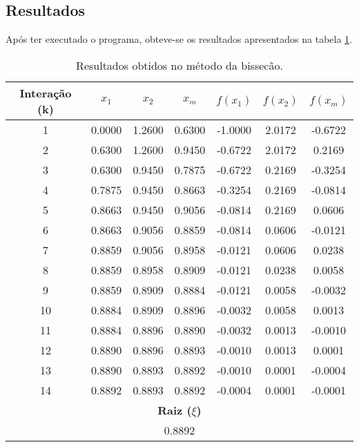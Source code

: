 \documentclass[a4paper,11pt, twoside]{article}
\newcommand{\n}[1]{\textbf{#1}}
\begin{document}
    \subsection*{Resultados}
    Após ter executado o programa, obteve-se os resultados apresentados na tabela \ref{bi}.
    	{\linespread{1}
	\begin{table}[!th]
		\begin{center}
		    \begin{tabular}{ c c c c c c c }
		        \toprule[0.11em]
		        \n{Interação (k)} & \n{$x_1$} & \n{$x_2$} & \n{$x_m$} & \n{$f(x_1)$} & \n{$f(x_2)$} & \n{$f(x_m)$}\\
		        \toprule[0.11em]
				1 & 0.0000 & 1.2600 & 0.6300 & -1.0000 & 2.0172 & -0.6722\\
				\midrule
				2 & 0.6300 & 1.2600 & 0.9450 & -0.6722 & 2.0172 & 0.2169\\
				\midrule
				3 & 0.6300 & 0.9450 & 0.7875 & -0.6722 & 0.2169 & -0.3254\\
				\midrule
				4 & 0.7875 & 0.9450 & 0.8663 & -0.3254 & 0.2169 & -0.0814\\
				\midrule
				5 & 0.8663 & 0.9450 & 0.9056 & -0.0814 & 0.2169 & 0.0606\\
				\midrule
				6 & 0.8663 & 0.9056 & 0.8859 & -0.0814 & 0.0606 & -0.0121\\
				\midrule
				7 & 0.8859 & 0.9056 & 0.8958 & -0.0121 & 0.0606 & 0.0238\\
				\midrule
				8 & 0.8859 & 0.8958 & 0.8909 & -0.0121 & 0.0238 & 0.0058\\
				\midrule
				9 & 0.8859 & 0.8909 & 0.8884 & -0.0121 & 0.0058 & -0.0032\\
				\midrule
				10 & 0.8884 & 0.8909 & 0.8896 & -0.0032 & 0.0058 & 0.0013\\
				\midrule
				11 & 0.8884 & 0.8896 & 0.8890 & -0.0032 & 0.0013 & -0.0010\\
				\midrule
				12 & 0.8890 & 0.8896 & 0.8893 & -0.0010 & 0.0013 & 0.0001\\
				\midrule
				13 & 0.8890 & 0.8893 & 0.8892 & -0.0010 & 0.0001 & -0.0004\\
				\midrule
				14 & 0.8892 & 0.8893 & 0.8892 & -0.0004 & 0.0001 & -0.0001\\
		        \toprule[0.11em]
		        \multicolumn{7}{c}{\n{Raiz ($\xi$)}}\\
		        \toprule[0.11em]
		        \multicolumn{7}{c}{0.8892}\\
		        \midrule
		    \end{tabular}
		\end{center}
		\caption{Resultados obtidos no método da bissecão.\label{bi}}
	\end{table}}
	
\end{document}

